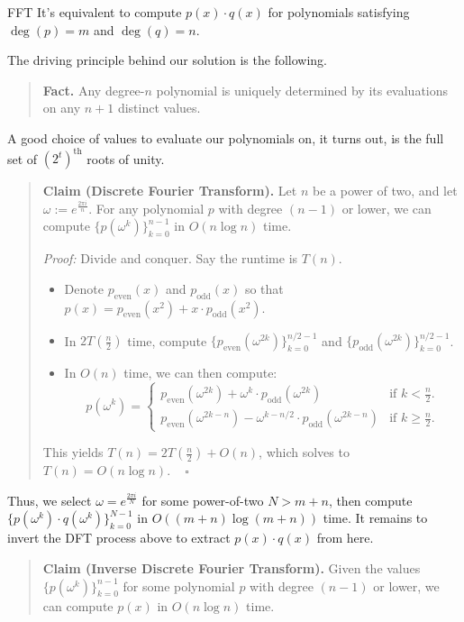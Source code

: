 \begin{solution}{FFT}
    It's equivalent to compute $p(x) \cdot q(x)$ for polynomials satisfying $\deg (p) = m$ and $\deg(q) = n$.

    The driving principle behind our solution is the following.
    \begin{quote}
        \textbf{Fact.} Any degree-$n$ polynomial is uniquely determined by its evaluations on any $n + 1$ distinct values.
    \end{quote}
    A good choice of values to evaluate our polynomials on, it turns out, is the full set of $(2^t)^{\text{th}}$ roots of unity.
    \begin{quote}
        \textbf{Claim (Discrete Fourier Transform).} Let $n$ be a power of two, and let $\omega := e^{\frac{2\pi i}{n}}$.  For any polynomial $p$ with degree $(n - 1)$ or lower, we can compute $\{p(\omega^{k}) \}_{k = 0}^{n - 1}$ in $O(n \log n)$ time.

        \emph{Proof:} Divide and conquer.  Say the runtime is $T(n)$.
        \begin{itemize}
            \item Denote $p_{\text{even}}(x)$ and $p_{\text{odd}}(x)$ so that $p(x) = p_{\text{even}}(x^2) + x \cdot p_{\text{odd}}(x^2)$.
            \item In $2T\left(\frac{n}{2}\right)$ time, compute $\{p_{\text{even}}(\omega^{2k})\}_{k = 0}^{n / 2 - 1}$ and $\{p_{\text{odd}}(\omega^{2k})\}_{k = 0}^{n / 2 - 1}$.
            \item In $O(n)$ time, we can then compute:
            \[ p(\omega^k) = \begin{cases}
                p_{\text{even}}\left(\omega^{2k}\right) + \omega^k \cdot p_{\text{odd}}\left(\omega^{2k}\right) & \text{if $k < \frac{n}{2}$.} \\
                p_{\text{even}}\left(\omega^{2k - n}\right) - \omega^{k - n/2} \cdot p_{\text{odd}}\left(\omega^{2k - n}\right) & \text{if $k \geq \frac{n}{2}$.}
            \end{cases} \]
        \end{itemize}
        This yields $T(n) = 2T\left(\frac{n}{2}\right) + O(n)$, which solves to $T(n) = O(n \log n)$. ~ $\square$
    \end{quote}
    Thus, we select $\omega = e^{\frac{2\pi i}{N}}$ for some power-of-two $N > m + n$, then compute $\{p(\omega^k) \cdot q(\omega^k)\}_{k = 0}^{N - 1}$ in $O((m + n) \log (m + n))$ time.  It remains to invert the DFT process above to extract $p(x) \cdot q(x)$ from here.
    \begin{quote}
        \textbf{Claim (Inverse Discrete Fourier Transform).} Given the values $\{p(\omega^k)\}_{k = 0}^{n - 1}$ for some polynomial $p$ with degree $(n - 1)$ or lower, we can compute $p(x)$ in $O(n \log n)$ time.


\end{quote}
\end{solution}
